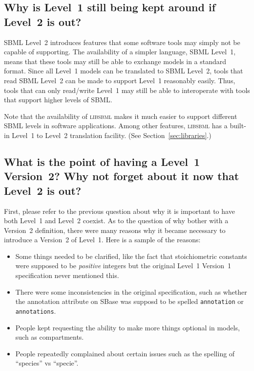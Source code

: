\documentclass{sbmlfaq}
\begin{document}
\subsection{Why is Level~1 still being kept around if Level~2 is out?}
\label{sec:why-keep-level-1}

SBML Level~2 introduces features that some software tools may simply not be
capable of supporting.  The availability of a simpler language, SBML
Level~1, means that these tools may still be able to exchange models in a
standard format.  Since all Level~1 models can be translated to SBML
Level~2, tools that read SBML Level~2 can be made to support Level~1
reasonably easily.  Thus, tools that can only read/write Level~1 may still
be able to interoperate with tools that support higher levels of SBML.

Note that the availability of \textsc{libsbml} makes it much easier to
support different SBML levels in software applications.  Among other
features, \textsc{libsbml} has a built-in Level~1 to Level~2 translation
facility.  (See Section~\ref{sec:libraries}.)


\subsection{What is the point of having a Level~1 Version~2?  Why not
  forget about it now that Level~2 is out?}

First, please refer to the previous question about why it is important to
have both Level~1 and Level~2 coexist.  As to the question of why bother
with a Version~2 definition, there were many reasons why it became
necessary to introduce a Version~2 of Level~1.  Here is a sample of the
reasons:
\begin{itemize}
  
\item Some things needed to be clarified, like the fact that stoichiometric
  constants were supposed to be \emph{positive} integers but the original
  Level~1 Version~1 specification never mentioned this.
  
\item There were some inconsistencies in the original specification, such
  as whether the annotation attribute on SBase was supposd to be spelled
  \texttt{annotation} or \texttt{annotations}.
  
\item People kept requesting the ability to make more things optional in
  models, such as compartments.
  
\item People repeatedly complained about certain issues such as the
  spelling of ``species'' vs ``specie''.

\end{itemize}
\end{document}
